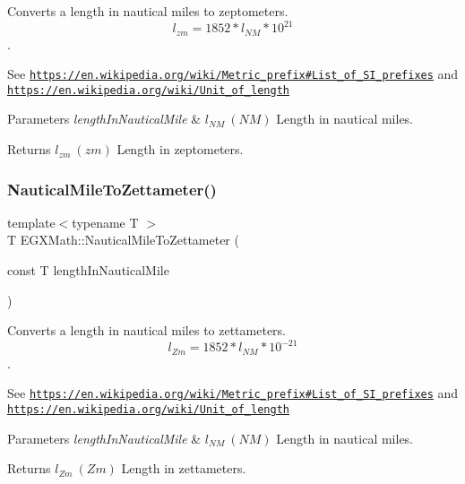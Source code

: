 Converts a length in nautical miles to zeptometers. \[ l_{zm}=1852 * l_{NM} * 10^{21} \]. 

See \href{https://en.wikipedia.org/wiki/Metric_prefix#List_of_SI_prefixes}{\tt https\+://en.\+wikipedia.\+org/wiki/\+Metric\+\_\+prefix\#\+List\+\_\+of\+\_\+\+S\+I\+\_\+prefixes} and \href{https://en.wikipedia.org/wiki/Unit_of_length}{\tt https\+://en.\+wikipedia.\+org/wiki/\+Unit\+\_\+of\+\_\+length} 
\begin{DoxyParams}{Parameters}
{\em length\+In\+Nautical\+Mile} & $ l_{NM}\ (NM)$ Length in nautical miles. \\
\hline
\end{DoxyParams}
\begin{DoxyReturn}{Returns}
$ l_{zm}\ (zm)$ Length in zeptometers. 
\end{DoxyReturn}
\mbox{\label{group___e_g_x_math-_conversions-_length_conversions-_non-_s_i-_nautical_mile-_s_i_ga3526b4110d429ac9e322baaa4c088e2b}} 
\subsubsection{\texorpdfstring{Nautical\+Mile\+To\+Zettameter()}{NauticalMileToZettameter()}}
{\footnotesize\ttfamily template$<$typename T $>$ \\
T E\+G\+X\+Math\+::\+Nautical\+Mile\+To\+Zettameter (\begin{DoxyParamCaption}\item[{const T}]{length\+In\+Nautical\+Mile }\end{DoxyParamCaption})}



Converts a length in nautical miles to zettameters. \[ l_{Zm}=1852 * l_{NM} * 10^{-21} \]. 

See \href{https://en.wikipedia.org/wiki/Metric_prefix#List_of_SI_prefixes}{\tt https\+://en.\+wikipedia.\+org/wiki/\+Metric\+\_\+prefix\#\+List\+\_\+of\+\_\+\+S\+I\+\_\+prefixes} and \href{https://en.wikipedia.org/wiki/Unit_of_length}{\tt https\+://en.\+wikipedia.\+org/wiki/\+Unit\+\_\+of\+\_\+length} 
\begin{DoxyParams}{Parameters}
{\em length\+In\+Nautical\+Mile} & $ l_{NM}\ (NM)$ Length in nautical miles. \\
\hline
\end{DoxyParams}
\begin{DoxyReturn}{Returns}
$ l_{Zm}\ (Zm)$ Length in zettameters. 
\end{DoxyReturn}
